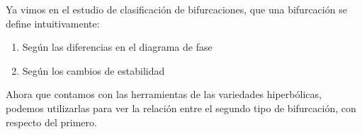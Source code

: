 \begin{exmp}
	
\end{exmp}


\begin{rmrk}
	Ya vimos en el estudio de clasificación de bifurcaciones, que una bifurcación se define intuitivamente:
	\begin{enumerate}
		\item Según las diferencias en el diagrama de fase
		\item Según los cambios de estabilidad
	\end{enumerate}
	
	Ahora que contamos con las herramientas de las variedades hiperbólicas, podemos utilizarlas para ver la relación entre el segundo tipo de bifurcación, con respecto del primero.
\end{rmrk}
